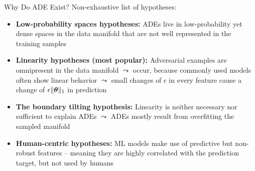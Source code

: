 \documentclass[11pt,compress,t,notes=noshow, aspectratio=169, xcolor=table]{beamer}
\begin{document}
\begin{vbframe}[c]{Why Do ADE Exist?}
    Non-exhaustive list of hypotheses:
    \begin{itemize}
        \item \textbf{Low-probability spaces hypotheses:} ADEs live in low-probability yet dense spaces in the data manifold that are not well represented in the training samples 
        \smallskip
        \item \textbf{Linearity hypotheses (most popular):} Adversarial examples are omnipresent in the data manifold $\leadsto$ occur, because commonly used models often show linear behavior $\leadsto$ small changes of $\epsilon$ in every feature cause a change of $\epsilon\|\thetab\|_1$ in prediction 
        \smallskip
        \item \textbf{The boundary tilting hypothesis:} Linearity is neither necessary nor sufficient to explain ADEs $\leadsto$ ADEs mostly result from overfitting the sampled manifold 
        \smallskip
        \item \textbf{Human-centric hypotheses:} ML models make use of predictive but non-robust features -- meaning they are highly correlated with the prediction target, but not used by humans 
    \end{itemize}

\end{vbframe}
\end{document}
